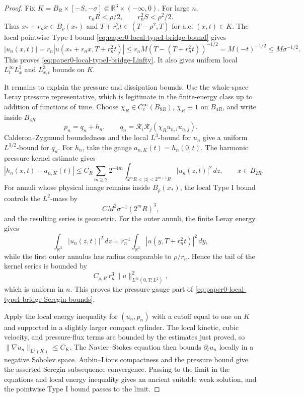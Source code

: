 \documentclass[11pt]{amsart}
\theoremstyle{plain}
\theoremstyle{definition}
\theoremstyle{remark}
\begin{document}
\begin{proof}
Fix \(K=B_R\times[-S,-\sigma]\Subset\mathbb R^3\times(-\infty,0)\).  For
large \(n\),
\[
  r_nR<\rho/2,\qquad r_n^2S<\rho^2/2.
\]
Thus \(x_*+r_nx\in B_\rho(x_*)\) and
\(T+r_n^2t\in(T-\rho^2,T)\) for a.e. \((x,t)\in K\).  The local pointwise Type I bound
\eqref{eq:paper0-local-typeI-bridge-bound} gives
\[
  |u_n(x,t)|
  =r_n|u(x_*+r_nx,T+r_n^2t)|
  \le r_nM(T-(T+r_n^2t))^{-1/2}
  =M(-t)^{-1/2}
  \le M\sigma^{-1/2}.
\]
This proves \eqref{eq:paper0-local-typeI-bridge-Linfty}.  It also gives
uniform local \(L^\infty_tL^2_x\) and \(L^3_{x,t}\) bounds on \(K\).

It remains to explain the pressure and dissipation bounds.  Use the
whole-space Leray pressure representative, which is legitimate in the
finite-energy class up to addition of functions of time.  Choose
\(\chi_R\in C_c^\infty(B_{8R})\), \(\chi_R\equiv1\) on \(B_{4R}\), and write
inside \(B_{4R}\)
\[
  p_n=q_n+h_n,\qquad
  q_n=\mathcal R_i\mathcal R_j(\chi_Ru_{n,i}u_{n,j}).
\]
Calderon--Zygmund boundedness and the local \(L^3\)-bound for \(u_n\) give a
uniform \(L^{3/2}\)-bound for \(q_n\).  For \(h_n\), take the gauge
\(a_{n,K}(t)=h_n(0,t)\).  The harmonic pressure kernel estimate gives
\[
  |h_n(x,t)-a_{n,K}(t)|
  \le
  C_R\sum_{m\ge2}2^{-4m}
  \int_{2^mR<|z|<2^{m+1}R}|u_n(z,t)|^2\,dz,
  \qquad x\in B_{2R}.
\]
For annuli whose physical image remains inside \(B_\rho(x_*)\), the local
Type I bound controls the \(L^2\)-mass by
\[
  C M^2\sigma^{-1}(2^mR)^3,
\]
and the resulting series is geometric.  For the outer annuli, the finite
Leray energy gives
\[
  \int_{\mathbb R^3}|u_n(z,t)|^2\,dz
  =r_n^{-1}\int_{\mathbb R^3}|u(y,T+r_n^2t)|^2\,dy,
\]
while the first outer annulus has radius comparable to \(\rho/r_n\).  Hence
the tail of the kernel series is bounded by
\[
  C_{\rho,R}\,r_n^3\|u\|_{L^\infty(0,T;L^2)}^2,
\]
which is uniform in \(n\).  This proves the pressure-gauge part of
\eqref{eq:paper0-local-typeI-bridge-Seregin-bounds}.

Apply the local energy inequality for \((u_n,p_n)\) with a cutoff equal to one
on \(K\) and supported in a slightly larger compact cylinder.  The local
kinetic, cubic velocity, and pressure-flux terms are bounded by the estimates
just proved, so \(\|\nabla u_n\|_{L^2(K)}\le C_K\).  The Navier--Stokes
equation then bounds \(\partial_tu_n\) locally in a negative Sobolev space.
Aubin--Lions compactness and the pressure bound give the asserted Seregin
subsequence convergence.  Passing to the limit in the equations and local
energy inequality gives an ancient suitable weak solution, and the pointwise
Type I bound passes to the limit.
\end{proof}
\end{document}
